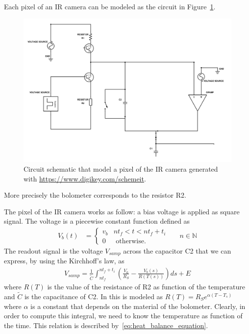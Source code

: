 Each pixel of an IR camera can be modeled as the circuit in Figure~\ref{fig:circuit}.
\begin{figure}[ht]
 \includegraphics[scale=0.31]{gfx/circuit.png}
\caption{Circuit schematic that model a pixel of the IR camera generated with \url{https://www.digikey.com/schemeit}.}
\label{fig:circuit}
\end{figure}
More precisely the bolometer corresponds to the resistor R2.

The pixel of the IR camera works as follow: a bias voltage is applied as square signal. The voltage is a piecewise constant function defined as
\begin{align} \label{eq:Vb}
 V_b(t)&=\begin{cases} v_b & n t_f < t < n t_f + t_i \\
 0 &\mbox{ otherwise.}
 \end{cases} && n \in {\mathbb N}
\end{align}
The readout signal is the voltage $V_{samp}$ across the capacitor C2 that we can express, by using the Kirchhoff's law, as
\begin{align} \label{eq:Vsamp_def}
 V_{samp} =
 \frac{1}{\tilde C} \int_{n t_f}^{n t_f + t_i} \left( \frac{V_0}{R_S} - \frac{V_b(s)}{R(T(s))} \right) ds + E
\end{align}
where $R(T)$ is the value of the resistance of R2 as function of the temperature and $\tilde C$ is the capacitance of C2. In \cite{xiu2010research} this is modeled as $R(T)=R_S e^{\alpha(T-T_s)}$ where $\alpha$ is a constant that depends on the material of the bolometer. Clearly, in order to compute this integral, we need to know the temperature as function of the time. This relation is described by~\eqref{eq:heat_balance_equation}.

